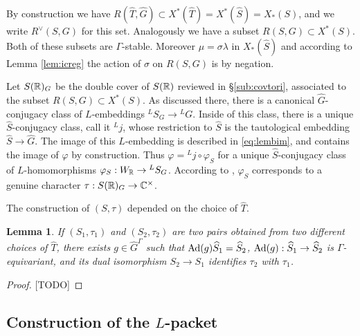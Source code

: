 \documentclass{article}
\newtheorem{lem}[thm]{Lemma}
\theoremstyle{definition}
\numberwithin{equation}{section}
\renewcommand{\-}{\hyp{}}
\newcommand{\warn}[1]{{\leavevmode\color{red}[#1]}}
\begin{document}
By construction we have $R(\hat T,\hat G) \subset X^*(\hat T)=X^*(\hat S)=X_*(S)$, and we write $R^\vee(S,G)$ for this set. Analogously we have a subset $R(S,G) \subset X^*(S)$. Both of these subsets are $\Gamma$-stable. Moreover $\mu=\sigma\lambda$ in $X_*(\hat S)$ and according to Lemma \ref{lem:icreg} the action of $\sigma$ on $R(S,G)$ is by negation.

Let $S(\mathbb{R})_G$ be the double cover of $S(\mathbb{R})$ reviewed in \S\ref{sub:covtori}, associated to the subset $R(S,G) \subset X^*(S)$. As discussed there, there is a canonical $\hat G$-conjugacy class of $L$-embeddings $^LS_G \to {^LG}$. Inside of this class, there is a unique $\hat S$-conjugacy class, call it $^Lj$, whose restriction to $\hat S$ is the tautological embedding $\hat S \to \hat G$. The image of this $L$-embedding is described in \eqref{eq:lembim}, and contains the image of $\varphi$ by construction. Thus $\varphi = {^Lj}\circ\varphi_S$ for a unique $\hat S$-conjugacy class of $L$-homomorphisms $\varphi_S : W_{\mathbb{R}} \to {^LS_G}$. According to \cite[Theorem 3.15]{KalDC}, $\varphi_S$ corresponds to a genuine character $\tau : S(\mathbb{R})_G \to \mathbb{C}^\times$.

The construction of $(S,\tau)$ depended on the choice of $\hat T$.

\begin{lem}
If $(S_1,\tau_1)$ and $(S_2,\tau_2)$ are two pairs obtained from two different choices of $\hat T$, there exists $g \in \hat G^\Gamma$ such that $\textrm{Ad}(g)\widehat S_1 = \widehat S_2$, $\textrm{Ad}(g) : \widehat S_1 \to \widehat S_2$ is $\Gamma$-equivariant, and its dual isomorphism $S_2 \to S_1$ identifies $\tau_2$ with $\tau_1$.
\end{lem}
\begin{proof}
	\warn{TODO}
\end{proof}

\subsection{Construction of the $L$-packet}

\end{document}
